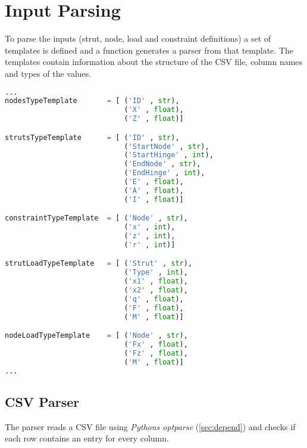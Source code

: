 \section{Input Parsing}
\label{sec:inputpars}

To parse the inputs (strut, node, load and constraint definitions) a set of templates is defined and a function generates a parser from that template.
The templates contain information about the structure of the CSV file, column names and types of the values.

\begin{inconsolata}
\begin{minipage}{\linewidth}
\begin{lstlisting}[language=python]
...
nodesTypeTemplate       = [ ('ID' , str),
                            ('X' , float),
                            ('Z' , float)]

strutsTypeTemplate      = [ ('ID' , str),
                            ('StartNode' , str),
                            ('StartHinge' , int),
                            ('EndNode' , str),
                            ('EndHinge' , int),
                            ('E' , float),
                            ('A' , float),
                            ('I' , float)]

constraintTypeTemplate  = [ ('Node' , str),
                            ('x' , int),
                            ('z' , int),
                            ('r' , int)]

strutLoadTypeTemplate   = [ ('Strut' , str),
                            ('Type' , int),
                            ('x1' , float),
                            ('x2' , float),
                            ('q' , float),
                            ('F' , float),
                            ('M' , float)]

nodeLoadTypeTemplate    = [ ('Node' , str),
                            ('Fx' , float),
                            ('Fz' , float),
                            ('M' , float)]
...
\end{lstlisting}
\end{minipage}
\end{inconsolata}

\subsection{CSV Parser}
\label{sec:csvparse}

The parser reads a CSV file using \textit{Pythons optparse} (\ref{sec:depend}) and checks if each row contains an entry for every column.


